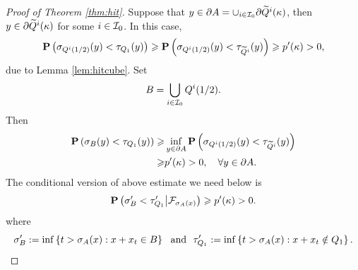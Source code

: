 \begin{proof}[Proof of Theorem \ref{thm:hit}]
		Suppose that $y\in \partial A=\cup_{i\in {\mathcal I}_0} \partial \widetilde{Q}^i(\kappa)$, then $y\in \partial \widetilde{Q}^i(\kappa)$ for some $i\in {\mathcal I}_0$. In this case, 
		\begin{equation*}
			{\mathbf P}\left( \sigma_{Q^i(1/2)}(y)< \tau_{Q_1}(y) \right)\geqslant {\mathbf P}\left( \sigma_{Q^i(1/2)}(y)< \tau_{\widetilde{Q}^i}(y) \right)\geqslant p'(\kappa)>0, 
		\end{equation*}
		due to Lemma \ref{lem:hitcube}. Set 
        \[
            B= \bigcup_{i\in {\mathcal I}_0} Q^i(1/2). 
        \]
        Then 
        \begin{equation*}
          \begin{aligned}
              {\mathbf P} \left( \sigma_{B}(y)<\tau_{Q_1}(y)\right)\geqslant& \inf_{y\in \partial A} {\mathbf P}\left( \sigma_{Q^i(1/2)}(y)< \tau_{\widetilde{Q}^i}(y) \right) \\
              \geqslant& p'(\kappa)>0, \quad \forall y\in \partial A. 
          \end{aligned}
        \end{equation*}
        The conditional version of above estimate we need below is 
         \begin{equation}\label{eq:hit2}
          \begin{aligned}
              {\mathbf P} \left( \sigma'_{B}<\tau'_{Q_1}\big| {\mathcal F}_{\sigma_A(x)}\right)\geqslant p'(\kappa)>0. 
          \end{aligned}
        \end{equation}
        where 
        \[
        \sigma'_B:=\inf\left\{t>\sigma_A(x): x+x_t\in B \right\} ~\mbox{ and }~ \tau'_{Q_1}:=\inf\left\{t>\sigma_A(x): x+x_t\notin Q_1\right\}. 
        \]
		

\end{proof}

